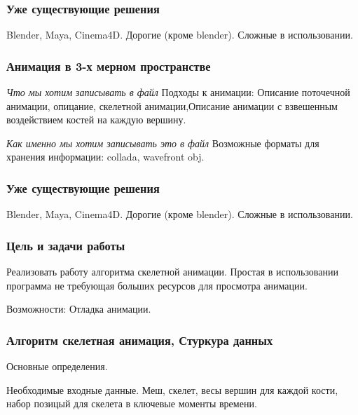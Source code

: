 \documentclass{beamer}
\begin{document}
\begin{frame}
\frametitle{Уже существующие решения}
    Blender, Maya, Cinema4D.
    Дорогие (кроме blender). Сложные в использовании.
    
\end{frame}



\begin{frame}
\frametitle{Анимация в 3-х мерном пространстве}
	\emph{Что мы хотим записывать в файл} 
	Подходы к анимации: Описание поточечной анимации, опицание, скелетной анимации,Описание анимации с взвешенным воздействием костей на каждую вершину.

\emph{Как именно мы хотим записывать это в файл}
    Возможные форматы для хранения информации: collada, wavefront obj.	
\end{frame}



\begin{frame}
\frametitle{Уже существующие решения}
    Blender, Maya, Cinema4D.
    Дорогие (кроме blender). Сложные в использовании.
    
\end{frame}




\begin{frame}
\frametitle{Цель и задачи работы}
    Реализовать работу алгоритма скелетной анимации.
    \medskip	
	Простая в использовании программа не требующая больших ресурсов для просмотра анимации.
	
	\medskip
    Возможности: Отладка анимации.
\end{frame}



\begin{frame}
\frametitle{Алгоритм скелетная анимация, Стуркура данных}
	Основные определения.
	
	\medskip
	
	Необходимые входные данные. Меш, скелет, весы вершин для каждой кости, набор позицый для скелета в ключевые моменты времени.

\end{frame}
\end{document}
